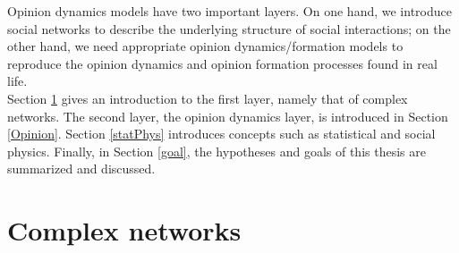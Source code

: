 \documentclass[11 pt , letterpaper , twoside , openright]{book}
\begin{document}
\newline
Opinion dynamics models have two important layers. On one hand, we introduce social networks to describe the underlying structure of social interactions; on the other hand, we need appropriate opinion dynamics/formation models to reproduce the opinion dynamics and opinion formation processes found in real life.\\
\newline
Section \ref{complNet} gives an introduction to the first layer, namely that of complex networks. The second layer, the opinion dynamics layer, is introduced in Section \ref{Opinion}. Section \ref{statPhys} introduces concepts such as statistical and social physics. Finally, in Section \ref{goal}, the hypotheses and goals of this thesis are summarized and discussed.


\section{Complex networks}\label{complNet}
\end{document}
